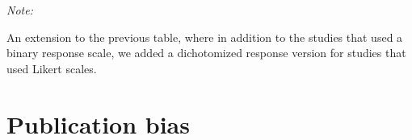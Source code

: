 \documentclass[
  man]{apa6}
\begin{document}
\begin{table}
\centering\centering
\caption{\label{tab:meta-odds-extended}Individual-level studies with binary response scales and Likert scale ratings collapsed to binary responses}
\centering
\begin{threeparttable}
\begin{tablenotes}
\item \textit{Note: } 
\item An extension to the previous table, where in addition to the studies that used a binary response scale, we added a dichotomized response version for studies that used Likert scales.
\end{tablenotes}
\end{threeparttable}
\end{table}

\clearpage

\section{Publication bias}\label{publication-bias}

\FloatBarrier
\end{document}

